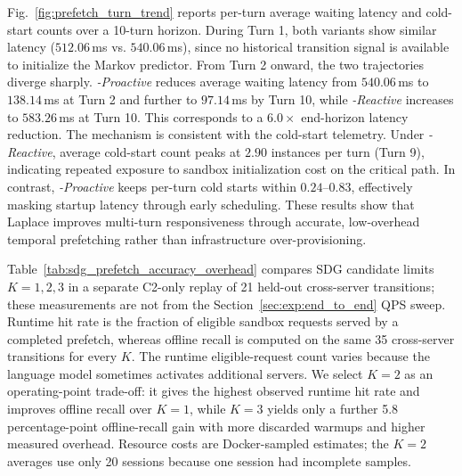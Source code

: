 Fig.~\ref{fig:prefetch_turn_trend} reports per-turn average waiting latency and cold-start counts over a 10-turn horizon. During Turn 1, both variants show similar latency 
($512.06$\,ms vs. $540.06$\,ms), since no historical transition signal is available to initialize the Markov predictor. From Turn 2 onward, the two trajectories diverge sharply. 
\textit{\SystemName-Proactive} reduces average waiting latency from $540.06$\,ms to $138.14$\,ms at Turn 2 and further to $97.14$\,ms by Turn 10, while \textit{\SystemName-Reactive} 
increases to $583.26$\,ms at Turn 10. This corresponds to a $6.0\times$ end-horizon latency reduction. The mechanism is consistent with the cold-start telemetry. Under 
\textit{\SystemName-Reactive}, average cold-start count peaks at $2.90$ instances per turn (Turn 9), indicating repeated exposure 
to sandbox initialization cost on the critical path. In contrast, \textit{\SystemName-Proactive} keeps per-turn cold starts within $0.24$--$0.83$, effectively masking startup 
latency through early scheduling. These results show that Laplace improves multi-turn responsiveness through accurate, low-overhead temporal prefetching rather than 
infrastructure over-provisioning.

Table~\ref{tab:sdg_prefetch_accuracy_overhead} compares SDG candidate limits $K=1,2,3$ in a separate C2-only replay of 21 held-out cross-server transitions; these measurements are not from the Section~\ref{sec:exp:end_to_end} QPS sweep. Runtime hit rate is the fraction of eligible sandbox requests served by a completed prefetch, whereas offline recall is computed on the same 35 cross-server transitions for every $K$. The runtime eligible-request count varies because the language model sometimes activates additional servers. We select $K=2$ as an operating-point trade-off: it gives the highest observed runtime hit rate and improves offline recall over $K=1$, while $K=3$ yields only a further 5.8 percentage-point offline-recall gain with more discarded warmups and higher measured overhead. Resource costs are Docker-sampled estimates; the $K=2$ averages use only 20 sessions because one session had incomplete samples.

